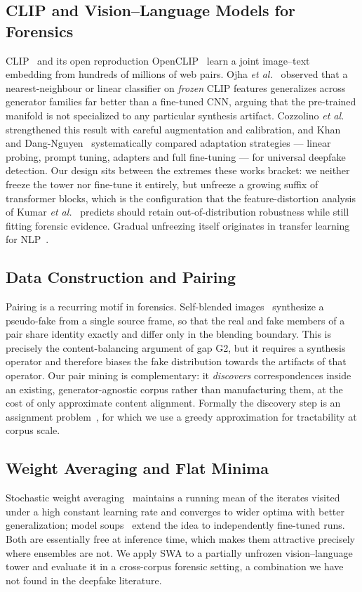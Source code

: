 \documentclass[10pt,journal]{IEEEtran}
\begin{document}
\subsection{CLIP and Vision--Language Models for Forensics}
CLIP~\cite{radford2021clip} and its open reproduction
OpenCLIP~\cite{ilharco2021openclip,cherti2023openclip} learn a joint
image--text embedding from hundreds of millions of web pairs. Ojha \emph{et
al.}~\cite{ojha2023universal} observed that a nearest-neighbour or linear
classifier on \emph{frozen} CLIP features generalizes across generator
families far better than a fine-tuned CNN, arguing that the pre-trained
manifold is not specialized to any particular synthesis artifact. Cozzolino
\emph{et al.}~\cite{cozzolino2024raising} strengthened this result with careful
augmentation and calibration, and Khan and
Dang-Nguyen~\cite{khan2024clipping} systematically compared adaptation
strategies --- linear probing, prompt tuning, adapters and full fine-tuning ---
for universal deepfake detection. Our design sits between the extremes these
works bracket: we neither freeze the tower nor fine-tune it entirely, but
unfreeze a growing suffix of transformer blocks, which is the configuration
that the feature-distortion analysis of Kumar \emph{et
al.}~\cite{kumar2022finetuning} predicts should retain out-of-distribution
robustness while still fitting forensic evidence. Gradual unfreezing itself
originates in transfer learning for NLP~\cite{howard2018ulmfit}.

\subsection{Data Construction and Pairing}
Pairing is a recurring motif in forensics. Self-blended
images~\cite{shiohara2022sbi} synthesize a pseudo-fake from a single source
frame, so that the real and fake members of a pair share identity exactly and
differ only in the blending boundary. This is precisely the content-balancing
argument of gap G2, but it requires a synthesis operator and therefore biases
the fake distribution towards the artifacts of that operator. Our pair mining
is complementary: it \emph{discovers} correspondences inside an existing,
generator-agnostic corpus rather than manufacturing them, at the cost of only
approximate content alignment. Formally the discovery step is an assignment
problem~\cite{kuhn1955hungarian,burkard2012assignment}, for which we use a
greedy approximation for tractability at corpus scale.

\subsection{Weight Averaging and Flat Minima}
Stochastic weight averaging~\cite{izmailov2018swa} maintains a running mean of
the iterates visited under a high constant learning rate and converges to
wider optima with better generalization; model soups~\cite{wortsman2022soups}
extend the idea to independently fine-tuned runs. Both are essentially free at
inference time, which makes them attractive precisely where ensembles are not.
We apply SWA to a partially unfrozen vision--language tower and evaluate it in
a cross-corpus forensic setting, a combination we have not found in the
deepfake literature.
\end{document}
